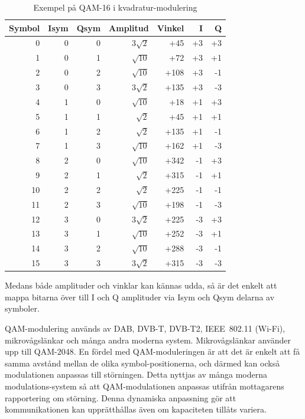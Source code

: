\begin{table}[h]
\begin{center}
\begin{tabular}{|r|r|r|r|r|r|r|}
\hline
Symbol & Isym & Qsym & Amplitud      & Vinkel &  I &   Q \\ \hline
     0 &    0 &    0 & \(3\sqrt{2}\) &    +45 & +3 &  +3 \\
     1 &    0 &    1 & \(\sqrt{10}\) &    +72 & +3 &  +1 \\
     2 &    0 &    2 & \(\sqrt{10}\) &   +108 & +3 &  -1 \\
     3 &    0 &    3 & \(3\sqrt{2}\) &   +135 & +3 &  -3 \\
     4 &    1 &    0 & \(\sqrt{10}\) &    +18 & +1 &  +3 \\
     5 &    1 &    1 &  \(\sqrt{2}\) &    +45 & +1 &  +1 \\
     6 &    1 &    2 &  \(\sqrt{2}\) &   +135 & +1 &  -1 \\
     7 &    1 &    3 & \(\sqrt{10}\) &   +162 & +1 &  -3 \\
     8 &    2 &    0 & \(\sqrt{10}\) &   +342 & -1 &  +3 \\
     9 &    2 &    1 &  \(\sqrt{2}\) &   +315 & -1 &  +1 \\
    10 &    2 &    2 &  \(\sqrt{2}\) &   +225 & -1 &  -1 \\
    11 &    2 &    3 & \(\sqrt{10}\) &   +198 & -1 &  -3 \\
    12 &    3 &    0 & \(3\sqrt{2}\) &   +225 & -3 &  +3 \\
    13 &    3 &    1 & \(\sqrt{10}\) &   +252 & -3 &  +1 \\
    14 &    3 &    2 & \(\sqrt{10}\) &   +288 & -3 &  -1 \\
    15 &    3 &    3 & \(3\sqrt{2}\) &   +315 & -3 &  -3 \\ \hline
\end{tabular}
\end{center}
\caption{Exempel på QAM-16 i kvadratur-modulering}
\label{tab:QAM-16}
\end{table}

Medans både amplituder och vinklar kan kännas udda, så är det enkelt att
mappa bitarna över till I och Q amplituder via Isym och Qsym delarna av
symboler.

QAM-modulering används av DAB, DVB-T, DVB-T2, IEEE~802.11 (Wi-Fi),
mikrovågslänkar och många andra moderna system.
Mikrovågslänkar använder upp till QAM-2048.
En fördel med QAM-moduleringen är att det är enkelt att få samma avstånd
mellan de olika symbol-positionerna, och därmed kan också modulationen anpassas
till störningen. Detta nyttjas av många moderna modulations-system så att
QAM-modulationen anpassas utifrån mottagarens rapportering om störning.
Denna dynamiska anpassning gör att kommunikationen kan upprätthållas även om
kapaciteten tillåts variera.

